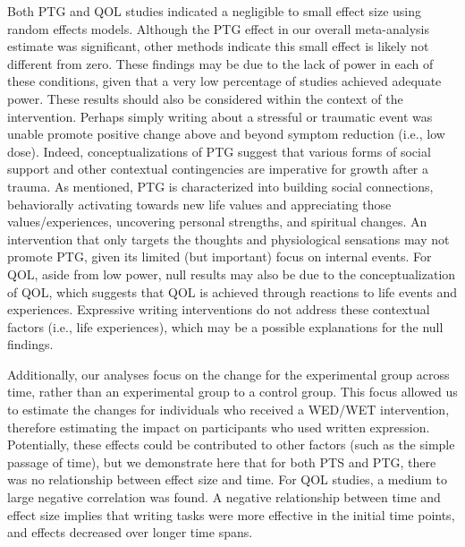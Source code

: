 \documentclass[man]{apa6}
\theoremstyle{definition}
\theoremstyle{definition}
\theoremstyle{definition}
\theoremstyle{remark}
\begin{document}
Both PTG and QOL studies indicated a negligible to small effect size
using random effects models. Although the PTG effect in our overall
meta-analysis estimate was significant, other methods indicate this
small effect is likely not different from zero. These findings may be
due to the lack of power in each of these conditions, given that a very
low percentage of studies achieved adequate power. These results should
also be considered within the context of the intervention. Perhaps
simply writing about a stressful or traumatic event was unable promote
positive change above and beyond symptom reduction (i.e., low dose).
Indeed, conceptualizations of PTG suggest that various forms of social
support and other contextual contingencies are imperative for growth
after a trauma. As mentioned, PTG is characterized into building social
connections, behaviorally activating towards new life values and
appreciating those values/experiences, uncovering personal strengths,
and spiritual changes. An intervention that only targets the thoughts
and physiological sensations may not promote PTG, given its limited (but
important) focus on internal events. For QOL, aside from low power, null
results may also be due to the conceptualization of QOL, which suggests
that QOL is achieved through reactions to life events and experiences.
Expressive writing interventions do not address these contextual factors
(i.e., life experiences), which may be a possible explanations for the
null findings.

Additionally, our analyses focus on the change for the experimental
group across time, rather than an experimental group to a control group.
This focus allowed us to estimate the changes for individuals who
received a WED/WET intervention, therefore estimating the impact on
participants who used written expression. Potentially, these effects
could be contributed to other factors (such as the simple passage of
time), but we demonstrate here that for both PTS and PTG, there was no
relationship between effect size and time. For QOL studies, a medium to
large negative correlation was found. A negative relationship between
time and effect size implies that writing tasks were more effective in
the initial time points, and effects decreased over longer time spans.
\end{document}
